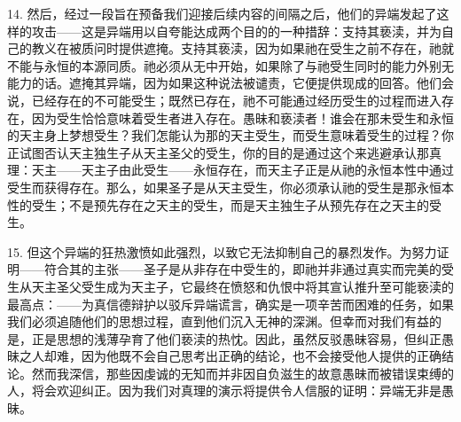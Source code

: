 14. 然后，经过一段旨在预备我们迎接后续内容的间隔之后，他们的异端发起了这样的攻击——这是异端用以自夸能达成两个目的的一种措辞：支持其亵渎，并为自己的教义在被质问时提供遮掩。支持其亵渎，因为如果祂在受生之前不存在，祂就不能与永恒的本源同质。祂必须从无中开始，如果除了与祂受生同时的能力外别无能力的话。遮掩其异端，因为如果这种说法被谴责，它便提供现成的回答。他们会说，已经存在的不可能受生；既然已存在，祂不可能通过经历受生的过程而进入存在，因为受生恰恰意味着受生者进入存在。愚昧和亵渎者！谁会在那未受生和永恒的天主身上梦想受生？我们怎能认为那的天主受生，而受生意味着受生的过程？你正试图否认天主独生子从天主圣父的受生，你的目的是通过这个来逃避承认那真理：天主——天主子由此受生——永恒存在，而天主子正是从祂的永恒本性中通过受生而获得存在。那么，如果圣子是从天主受生，你必须承认祂的受生是那永恒本性的受生；不是预先存在之天主的受生，而是天主独生子从预先存在之天主的受生。\par

15. 但这个异端的狂热激愤如此强烈，以致它无法抑制自己的暴烈发作。为努力证明——符合其的主张——圣子是从非存在中受生的，即祂并非通过真实而完美的受生从天主圣父受生成为天主子，它最终在愤怒和仇恨中将其宣认推升至可能亵渎的最高点：——为真信德辩护以驳斥异端谎言，确实是一项辛苦而困难的任务，如果我们必须追随他们的思想过程，直到他们沉入无神的深渊。但幸而对我们有益的是，正是思想的浅薄孕育了他们亵渎的热忱。因此，虽然反驳愚昧容易，但纠正愚昧之人却难，因为他既不会自己思考出正确的结论，也不会接受他人提供的正确结论。然而我深信，那些因虔诚的无知而并非因自负滋生的故意愚昧而被错误束缚的人，将会欢迎纠正。因为我们对真理的演示将提供令人信服的证明：异端无非是愚昧。\par

